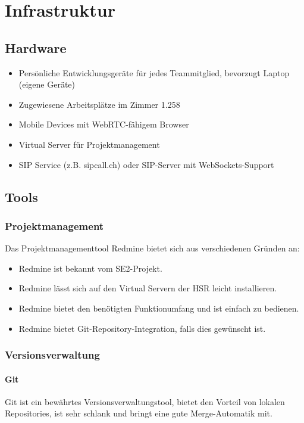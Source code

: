 \chapter{Infrastruktur}

\section{Hardware}
\begin{itemize}
	\setlength{\itemsep}{-\parsep}
	\item Persönliche Entwicklungsgeräte für jedes Teammitglied, bevorzugt Laptop (eigene Geräte)
	\item Zugewiesene Arbeitsplätze im Zimmer 1.258
	\item Mobile Devices mit WebRTC-fähigem Browser
	\item Virtual Server für Projektmanagement
	\item SIP Service (z.B. sipcall.ch) oder SIP-Server mit WebSockets-Support
\end{itemize}

\section{Tools}
\subsection{Projektmanagement}
Das Projektmanagementtool Redmine bietet sich aus verschiedenen Gründen an:
\begin{itemize}
	\setlength{\itemsep}{-\parsep}
	\item Redmine ist bekannt vom SE2-Projekt.
	\item Redmine lässt sich auf den Virtual Servern der HSR leicht installieren.
	\item Redmine bietet den benötigten Funktionumfang und ist einfach zu bedienen.
	\item Redmine bietet Git-Repository-Integration, falls dies gewünscht ist.
\end{itemize}


\subsection{Versionsverwaltung}
\subsubsection{Git}
Git ist ein bewährtes Versionsverwaltungstool, bietet den Vorteil von lokalen Repositories, ist sehr schlank und bringt eine gute Merge-Automatik mit.

